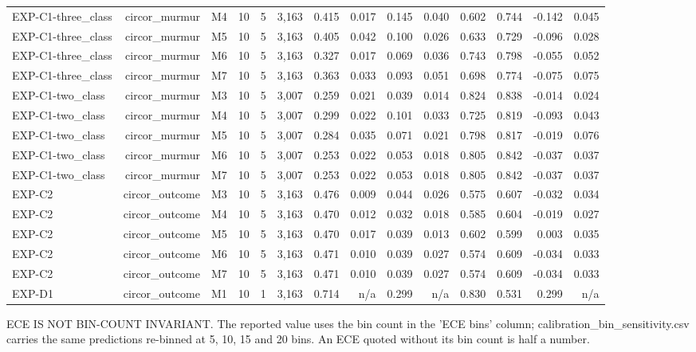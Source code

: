 \begin{table}[htbp]
\begin{tabular}{lrrrrrrrrrrrrr}
    EXP-C1-three\_class & circor\_murmur & M4 & 10 & 5 & 3,163 & 0.415 & 0.017 & 0.145 & 0.040 & 0.602 & 0.744 & -0.142 & 0.045 \\
    EXP-C1-three\_class & circor\_murmur & M5 & 10 & 5 & 3,163 & 0.405 & 0.042 & 0.100 & 0.026 & 0.633 & 0.729 & -0.096 & 0.028 \\
    EXP-C1-three\_class & circor\_murmur & M6 & 10 & 5 & 3,163 & 0.327 & 0.017 & 0.069 & 0.036 & 0.743 & 0.798 & -0.055 & 0.052 \\
    EXP-C1-three\_class & circor\_murmur & M7 & 10 & 5 & 3,163 & 0.363 & 0.033 & 0.093 & 0.051 & 0.698 & 0.774 & -0.075 & 0.075 \\
    EXP-C1-two\_class & circor\_murmur & M3 & 10 & 5 & 3,007 & 0.259 & 0.021 & 0.039 & 0.014 & 0.824 & 0.838 & -0.014 & 0.024 \\
    EXP-C1-two\_class & circor\_murmur & M4 & 10 & 5 & 3,007 & 0.299 & 0.022 & 0.101 & 0.033 & 0.725 & 0.819 & -0.093 & 0.043 \\
    EXP-C1-two\_class & circor\_murmur & M5 & 10 & 5 & 3,007 & 0.284 & 0.035 & 0.071 & 0.021 & 0.798 & 0.817 & -0.019 & 0.076 \\
    EXP-C1-two\_class & circor\_murmur & M6 & 10 & 5 & 3,007 & 0.253 & 0.022 & 0.053 & 0.018 & 0.805 & 0.842 & -0.037 & 0.037 \\
    EXP-C1-two\_class & circor\_murmur & M7 & 10 & 5 & 3,007 & 0.253 & 0.022 & 0.053 & 0.018 & 0.805 & 0.842 & -0.037 & 0.037 \\
    EXP-C2 & circor\_outcome & M3 & 10 & 5 & 3,163 & 0.476 & 0.009 & 0.044 & 0.026 & 0.575 & 0.607 & -0.032 & 0.034 \\
    EXP-C2 & circor\_outcome & M4 & 10 & 5 & 3,163 & 0.470 & 0.012 & 0.032 & 0.018 & 0.585 & 0.604 & -0.019 & 0.027 \\
    EXP-C2 & circor\_outcome & M5 & 10 & 5 & 3,163 & 0.470 & 0.017 & 0.039 & 0.013 & 0.602 & 0.599 & 0.003 & 0.035 \\
    EXP-C2 & circor\_outcome & M6 & 10 & 5 & 3,163 & 0.471 & 0.010 & 0.039 & 0.027 & 0.574 & 0.609 & -0.034 & 0.033 \\
    EXP-C2 & circor\_outcome & M7 & 10 & 5 & 3,163 & 0.471 & 0.010 & 0.039 & 0.027 & 0.574 & 0.609 & -0.034 & 0.033 \\
    EXP-D1 & circor\_outcome & M1 & 10 & 1 & 3,163 & 0.714 & n/a & 0.299 & n/a & 0.830 & 0.531 & 0.299 & n/a \\
    \bottomrule
  \end{tabular}
  \par\footnotesize ECE IS NOT BIN-COUNT INVARIANT. The reported value uses the bin count in the 'ECE bins' column; calibration\_bin\_sensitivity.csv carries the same predictions re-binned at 5, 10, 15 and 20 bins. An ECE quoted without its bin count is half a number.

\end{table}
